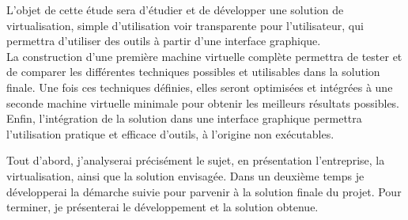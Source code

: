 
L'objet de cette étude sera d'étudier et de développer une solution de virtualisation, simple d'utilisation voir transparente pour l'utilisateur, qui permettra d'utiliser des outils à partir d'une interface graphique.
\\





La construction d'une première machine virtuelle complète permettra de tester et de comparer les différentes techniques possibles et utilisables dans la solution finale.
Une fois ces techniques définies, elles seront optimisées et intégrées à une seconde machine virtuelle minimale pour obtenir les meilleurs résultats possibles.
Enfin, l'intégration de la solution dans une interface graphique permettra l'utilisation pratique et efficace d'outils, à l'origine non exécutables.



Tout d'abord, j'analyserai précisément le sujet, en présentation l'entreprise, la virtualisation, ainsi que la solution envisagée.
Dans un deuxième temps je développerai la démarche suivie pour parvenir à la solution finale du projet.
Pour terminer, je présenterai le développement et la solution obtenue.